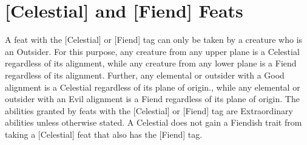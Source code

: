 \section{[Celestial] and [Fiend] Feats} \label{feats:outsider}

A feat with the [Celestial] or [Fiend] tag can only be taken by a creature who is an Outsider. For this purpose, any creature from any upper plane is a Celestial regardless of its alignment, while any creature from any lower plane is a Fiend regardless of its alignment. Further, any elemental or outsider with a Good alignment is a Celestial regardless of its plane of origin., while any elemental or outsider with an Evil alignment is a Fiend regardless of its plane of origin. The abilities granted by feats with the [Celestial] or [Fiend] tag are Extraordinary abilities unless otherwise stated. A Celestial does not gain a Fiendish trait from taking a [Celestial] feat that also has the [Fiend] tag.

